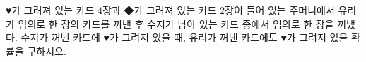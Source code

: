 ♥가 그려져 있는 카드 $4$장과 ◆가 그려져 있는 카드 $2$장이 들어 있는 주머니에서 유리가 임의로 한 장의 카드를 꺼낸 후 수지가 남아 있는 카드 중에서 임의로 한 장을 꺼냈다. 수지가 꺼낸 카드에 ♥가 그려져 있을 때, 유리가 꺼낸 카드에도 ♥가 그려져 있을 확률을 구하시오.
